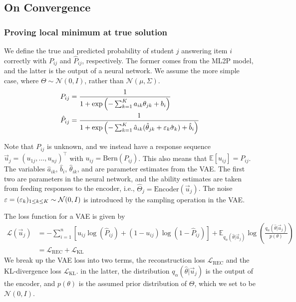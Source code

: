 \subsection{On Convergence}

\subsubsection{Proving local minimum at true solution}

We define the true and predicted probability of student $j$ answering item $i$ correctly with $P_{ij}$ and $\hat P_{ij}$, respectively. The former comes from the ML2P model, and the latter is the output of a neural network. We assume the more simple case, where $\Theta \sim \mathcal{N}(0,I)$, rather than $\mathcal{N}(\mu, \Sigma)$.
\begin{equation}
  \begin{split}
  P_{ij} &= \frac{1}{1 + \exp\left(-\sum_{k=1}^K a_{ik}\theta_{jk} + b_i\right)}\\
  \label{eq:ml2p}
  \hat P_{ij} &= \frac{1}{1 + \exp\left(-\sum_{k=1}^K \hat a_{ik} (\hat \theta_{jk} + \varepsilon_k \hat \sigma_k) + \hat b_i\right)} 
\end{split}
    \label{eq:vae_out}
\end{equation}

Note that $P_{ij}$ is unknown, and we instead have a response sequence $\vec u_j = (u_{1j},\ldots, u_{nj})^\top$ with $u_{ij} = \text{Bern}(P_{ij})$. This also means that $\mathbb{E}[u_{ij}] = P_{ij}$. The variables $\hat a_{ik}$, $\hat b_i$, $\hat \theta_{ik}$, and are parameter estimates from the VAE. The first two are parameters in the neural network, and the ability estimates are taken from feeding responses to the encoder, i.e., $\hat \Theta_j = \text{Encoder}(\vec u_j)$. The noise $\varepsilon = (\varepsilon_k)_{1\leq k \leq K} \sim \mathcal{N}(0,I)$ is introduced by the sampling operation in the VAE.

The loss function for a VAE is given by 
\begin{equation}
  \begin{split}
  \mathcal{L}(\vec u_j) &= -\sum_{i=1}^n \left[u_{ij} \log(\hat P_{ij}) + (1-u_{ij})\log(1 - \hat P_{ij})\right] + \mathbb{E}_{q_\alpha(\hat \theta | \vec u_j)}\log\left( \frac{q_{\alpha}(\hat \theta |\vec u_j)}{p(\theta)}\right) \\
    &= \mathcal{L}_{\text{REC}} + \mathcal{L}_{\text{KL}}
  \end{split}
  \label{eq:vae_loss}
\end{equation}
We break up the VAE loss into two terms, the reconstruction loss $\mathcal{L}_{\text{REC}}$ and the KL-divergence loss $\mathcal{L}_{\text{KL}}$. in the latter, the distribution $q_\alpha(\hat \theta | \vec u_j)$ is the output of the encoder, and $p(\theta)$ is the assumed prior distribution of $\Theta$, which we set to be $\mathcal{N}(0,I)$.

